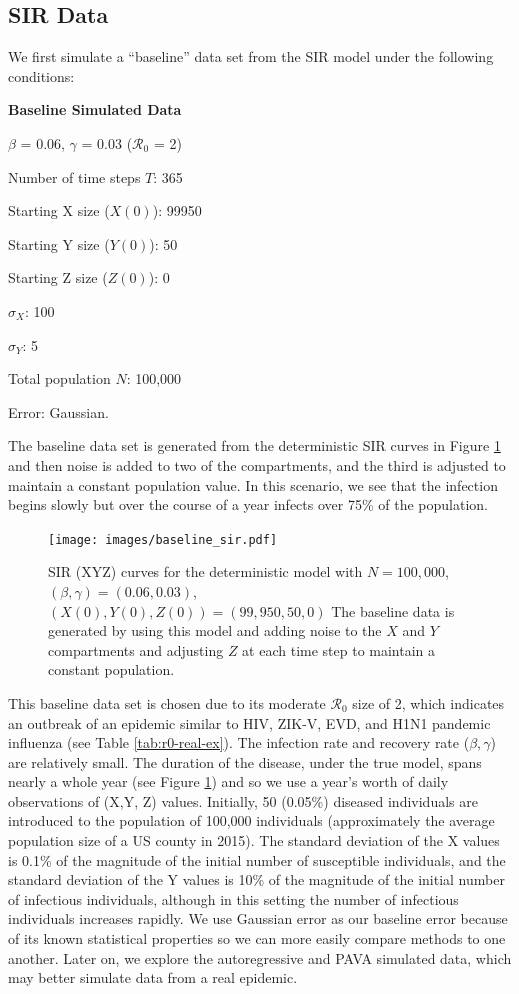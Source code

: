 \documentclass[12pt]{article}
\newcommand{\rr}{\ensuremath{\mathcal{R}_0}}
\begin{document}
\subsection{SIR Data}

We first simulate a ``baseline'' data set from the SIR model under the following conditions: 

\textbf{Baseline Simulated Data}
\begin{center}
	
	$\beta$ = 0.06, $\gamma$ = 0.03 ($\rr$ = 2)
	
	Number of time steps $T$: 365
	
	Starting X size ($X(0)$): 99950
	
	Starting Y size ($Y(0)$): 50
	
	Starting Z size ($Z(0)$): 0 
	
	$\sigma_X$: 100
	
	$\sigma_Y$: 5
	
	Total population $N$: 100,000

        Error: Gaussian.
	
      \end{center}
      The baseline data set is generated from the deterministic SIR curves in Figure \ref{fig:baseline-data} and then noise is added to two of the compartments, and the third is adjusted to maintain a constant population value.  In this scenario, we see that the infection begins slowly but over the course of a year infects over 75\% of the population.
      \begin{figure}
        \centering
        \texttt{[image: images/baseline\_sir.pdf]}
        \caption{SIR (XYZ) curves for the deterministic model with $N=100,000$, $(\beta, \gamma) = (0.06, 0.03)$, $(X(0), Y(0), Z(0))= (99,950, 50,0)$  The baseline data is generated by using this model and adding noise to the $X$ and $Y$ compartments and adjusting $Z$ at each time step to maintain a constant population.}\label{fig:baseline-data}
        \end{figure}
      This baseline data set is chosen due to its moderate $\rr$ size of 2, which indicates an outbreak of an epidemic similar to HIV, ZIK-V, EVD, and H1N1 pandemic influenza (see Table \ref{tab:r0-real-ex}).  The infection rate and recovery rate ($\beta, \gamma$) are relatively small.  The duration of the disease, under the true model, spans nearly a whole year (see Figure \ref{fig:baseline-data}) and so we use a year's worth of daily observations of (X,Y, Z) values.  Initially, 50 (0.05\%) diseased individuals are introduced to the population of 100,000 individuals (approximately the average population size of a US county in 2015).  The standard deviation of the X values is 0.1\% of the magnitude of the initial number of susceptible individuals, and the standard deviation of the Y values is 10\% of the magnitude of the initial number of infectious individuals, although in this setting the number of infectious individuals increases rapidly.  We use Gaussian error as our baseline error because of its known statistical properties so we can more easily compare methods to one another.  Later on, we explore the autoregressive and PAVA simulated data, which may better simulate data from  a real epidemic.
\end{document}
